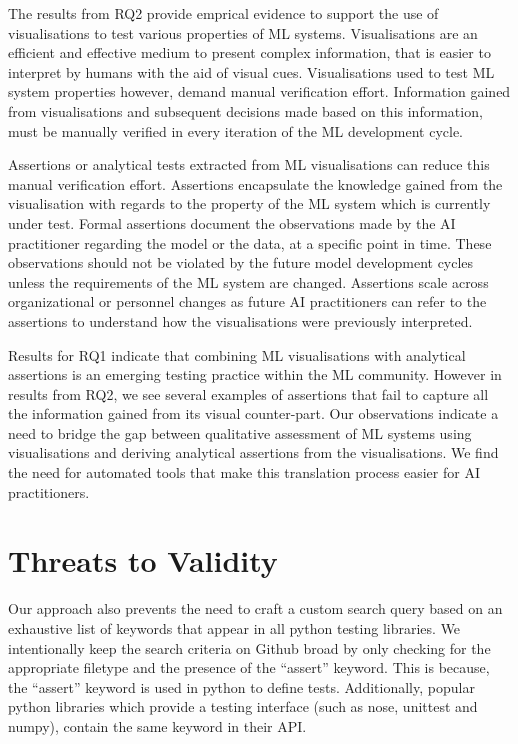 \documentclass[conference]{IEEEtran}
\begin{document}
The results from RQ2 provide emprical evidence to support the use of visualisations to test various properties of ML systems.  Visualisations are an efficient and effective medium to present complex information, that is easier to interpret by humans with the aid of visual cues. Visualisations used to test ML system properties however, demand manual verification effort. Information gained from visualisations and subsequent decisions made based on this information, must be manually verified in every iteration of the ML development cycle.


Assertions or analytical tests extracted from ML visualisations can reduce this manual verification effort. Assertions encapsulate the knowledge gained from the visualisation with regards to the property of the ML system which is currently under test. Formal assertions document the observations made by the AI practitioner regarding the model or the data, at a specific point in time. These observations should not be violated by the future model development cycles unless the requirements of the ML system are changed. Assertions scale across organizational or personnel changes as future AI practitioners can refer to the assertions to understand how the visualisations were previously interpreted.

Results for RQ1 indicate that combining ML visualisations with analytical assertions is an emerging testing practice within the ML community. However in results from RQ2, we see several examples of assertions that fail to capture all the information gained from its visual counter-part. Our observations indicate a need to bridge the gap between qualitative assessment of ML systems using visualisations and deriving analytical assertions from the visualisations. We find the need for automated tools that make this translation process easier for AI practitioners.

\section{Threats to Validity}\label{sec:threats}

Our approach also prevents the need to craft a custom search query based on an exhaustive list of keywords that appear in all python testing libraries. We intentionally keep the search criteria on Github broad by only checking for the appropriate filetype and the presence of the ``assert'' keyword. This is because, the ``assert'' keyword is used in python to define tests. Additionally, popular python libraries which provide a testing interface (such as nose, unittest and numpy), contain the same keyword in their API. 
\end{document}
